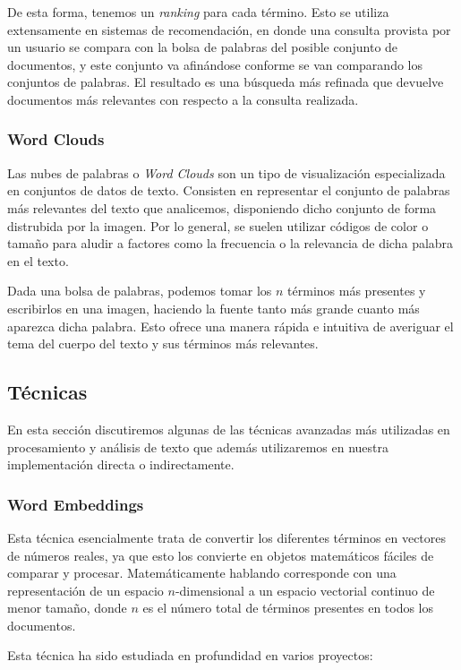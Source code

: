 De esta forma, tenemos un \textit{ranking} para cada término. Esto se utiliza extensamente en sistemas de recomendación, en donde una consulta provista por un usuario se compara con la bolsa de palabras del posible conjunto de documentos, y este conjunto va afinándose conforme se van comparando los conjuntos de palabras. El resultado es una búsqueda más refinada que devuelve documentos más relevantes con respecto a la consulta realizada.

\subsubsection{Word Clouds}
Las nubes de palabras o \textit{Word Clouds} son un tipo de visualización especializada en conjuntos de datos de texto. Consisten en representar el conjunto de palabras más relevantes del texto que analicemos, disponiendo dicho conjunto de forma distrubida por la imagen. Por lo general, se suelen utilizar códigos de color o tamaño para aludir a factores como la frecuencia o la relevancia de dicha palabra en el texto.

Dada una bolsa de palabras, podemos tomar los $n$ términos más presentes y escribirlos en una imagen, haciendo la fuente tanto más grande cuanto más aparezca dicha palabra. Esto ofrece una manera rápida e intuitiva de averiguar el tema del cuerpo del texto y sus términos más relevantes.


\subsection{Técnicas}
En esta sección discutiremos algunas de las técnicas avanzadas más utilizadas en procesamiento y análisis de texto que además utilizaremos en nuestra implementación directa o indirectamente.

\subsubsection{Word Embeddings}
Esta técnica esencialmente trata de convertir los diferentes términos en vectores de números reales, ya que esto los convierte en objetos matemáticos fáciles de comparar y procesar. Matemáticamente hablando corresponde con una representación de un espacio $n$-dimensional a un espacio vectorial continuo de menor tamaño, donde $n$ es el número total de términos presentes en todos los documentos.

Esta técnica ha sido estudiada en profundidad en varios proyectos:

